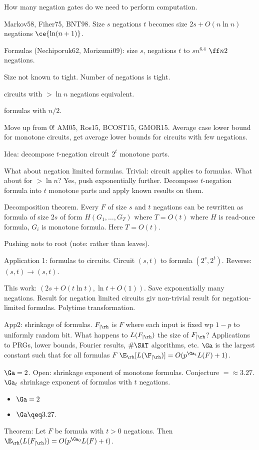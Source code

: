 How many negation gates do we need to perform computation.

Markov58, Fiher75, BNT98. Size $s$ negations $t$ becomes size $2s+O(n\ln n)$ negations $\ce{\ln (n+1)}$.

Formulas (Nechiporuk62, Morizumi09): size $s$, negations $t$ to $sn^{6.4}$ $\ff n2$ negations.

Size not known to tight. Number of negations is tight.

circuits with $>\ln n$ negations equivalent.

formulas with $n/2$.

Move up from 0! AM05, Ros15, BCOST15, GMOR15. Average case lower bound for monotone circuits, get average lower bounds for circuits with few negations.

Idea: decompose $t$-negation circuit $2^t$ monotone parts.

What about negation limited formulas. Trivial: circuit applies to formulas. What about for $>\ln n$?
Yes, push exponentially further. Decompose $t$-negation formula into $t$ monotone parts and apply known results on them.

Decomposition theorem. Every $F$ of size $s$ and $t$ negations can be rewritten as formula of size $2s$ of form $H(G_1,\ldots, G_T)$ where $T=O(t)$ where $H$ is read-once formula, $G_i$ is monotone formula. Here $T=O(t)$.

Pushing nots to root (note: rather than leaves). 

Application 1: formulas to circuits. Circuit $(s,t)$ to formula $(2^s,2^t)$. Reverse: $(s,t)\to (s,t)$. 

This work: $(2s+O(t\ln t), \ln t+O(1))$. Save exponentially many negations. Result for negation limited circuits giv non-trivial result for negation-limited formulas.
Polytime transformation.

App2: shrinkage of formulas. $F_{|\rh}$ is $F$ where each input is fixed wp $1-p$ to uniformly random bit. What happens to $L(F_{|\rh})$ the size of $F_{|\rh}$? Applications to PRGs, lower bounds, Fourier results, $\#\SAT$ algorithms, etc. $\Ga$ is the largest constant such that for all formulas $F$ $\E_\rh[L(\F_{|\rh})]=O(p^{\Ga_t}L(F)+1)$.

$\Ga=2$. Open: shrinkage exponent of monotone formulas. Conjecture $=\approx3.27$.
$\Ga_t$ shrinkage exponent of formulas with $t$ negations. 
\begin{itemize}
\item
$\Ga=2$
\item
$\Ga\qeq 3.27$.
\end{itemize}
Theorem: Let $F$ be formula with $t>0$ negations. Then $\E_{\rh}(L(F_{|\rh}))=O(p^{\Ga_0}L(F)+t)$. 

